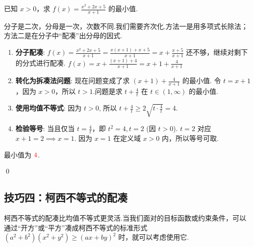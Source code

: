 \begin{exercise}
	已知 $x>0$，求 $f(x) = \frac{x^2+2x+5}{x+1}$ 的最小值.
\end{exercise}
\begin{solution}
	\textcolor{green!50!black}{分子是二次，分母是一次，次数不同.我们需要齐次化.方法一是用多项式长除法；方法二是在分子中“配凑”出分母的因式.}
	\begin{enumerate}
		\item \textbf{分子配凑}:
		$f(x) = \frac{x^2+2x+5}{x+1} = \frac{x(x+1)+x+5}{x+1} = x + \frac{x+5}{x+1}$
		\textcolor{green!50!black}{还不够，继续对剩下的分式进行配凑.}
		$f(x) = x + \frac{(x+1)+4}{x+1} = x + 1 + \frac{4}{x+1}$
		
		\item \textbf{转化为拆凑法问题}:
		现在问题变成了求 $(x+1)+\frac{4}{x+1}$ 的最小值.
		令 $t=x+1$，因为 $x>0$，所以 $t>1$.问题是求 $t+\frac{4}{t}$ 在 $t \in (1, \infty)$ 的最小值.
		
		\item \textbf{使用均值不等式}:
		因为 $t>0$, 所以 $t+\frac{4}{t} \ge 2\sqrt{t\cdot\frac{4}{t}} = 4$.
		
		\item \textbf{检验等号}:
		当且仅当 $t = \frac{4}{t}$，即 $t^2=4, t=2$ (因 $t>0$).
		$t=2$ 对应 $x+1=2 \implies x=1$.
		因为 $x=1$ 在定义域 $x>0$ 内，所以等号可取.
	\end{enumerate}
	最小值为 $\textcolor{red}{4}$.
\end{solution}
\qed

\subsection{技巧四：柯西不等式的配凑}

柯西不等式的配凑比均值不等式更灵活.当我们面对的目标函数或约束条件，可以通过“开方”或“平方”凑成柯西不等式的标准形式 $(a^2+b^2)(x^2+y^2) \ge (ax+by)^2$ 时，就可以考虑使用它.

